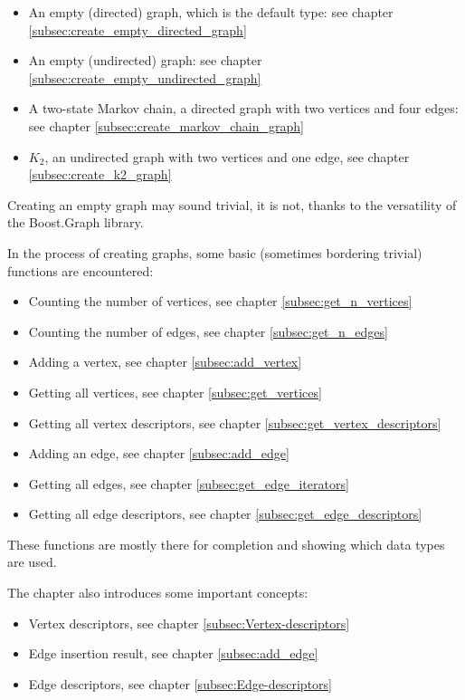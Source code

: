 \begin{itemize}
  \item An empty (directed) graph, which is the default type: 
    see chapter \ref{subsec:create_empty_directed_graph}
  \item An empty (undirected) graph: 
    see chapter \ref{subsec:create_empty_undirected_graph}
  \item A two-state Markov chain, a directed graph with two vertices 
    and four edges:
    see chapter \ref{subsec:create_markov_chain_graph}
  \item $K_{2}$, an undirected graph with two vertices and one edge, 
    see chapter \ref{subsec:create_k2_graph}
\end{itemize}


Creating an empty graph may sound trivial, it is not, thanks to the versatility
of the Boost.Graph library.

In the process of creating graphs, some basic (sometimes bordering trivial)
functions are encountered:

\begin{itemize}
  \item Counting the number of vertices, 
    see chapter \ref{subsec:get_n_vertices}
  \item Counting the number of edges,
     see chapter \ref{subsec:get_n_edges}
  \item Adding a vertex,
     see chapter \ref{subsec:add_vertex}
  \item Getting all vertices,
     see chapter \ref{subsec:get_vertices}
  \item Getting all vertex descriptors,
     see chapter \ref{subsec:get_vertex_descriptors}
  \item Adding an edge,
     see chapter \ref{subsec:add_edge}
  \item Getting all edges,
    see chapter \ref{subsec:get_edge_iterators}
  \item Getting all edge descriptors,
    see chapter \ref{subsec:get_edge_descriptors}
\end{itemize}

These functions are mostly there for completion and showing which data types
are used.

The chapter also introduces some important concepts:

\begin{itemize}
  \item Vertex descriptors,
    see chapter \ref{subsec:Vertex-descriptors}
  \item Edge insertion result,
    see chapter \ref{subsec:add_edge}
  \item Edge descriptors,
    see chapter \ref{subsec:Edge-descriptors}
\end{itemize}

